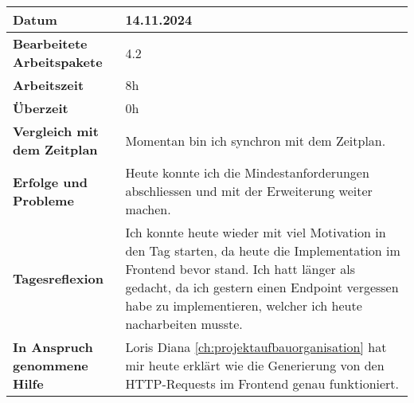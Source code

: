 \begin{longtable}{p{}|p{}}
	\hline
	\textbf{Datum}                       & 14.11.2024            \\
	\hline
	\textbf{Bearbeitete Arbeitspakete}   & 4.2                  \\
	\hline
	\textbf{Arbeitszeit}                 & 8h                                    \\
	\hline
	\textbf{Überzeit}                    & 0h                                    \\
	\hline
	\textbf{Vergleich mit dem Zeitplan}  & Momentan bin ich synchron mit dem Zeitplan. \\
	\hline
	\textbf{Erfolge und Probleme} & Heute konnte ich die Mindestanforderungen abschliessen und mit der Erweiterung weiter machen.
	\\
	\hline
	\textbf{Tagesreflexion} & Ich konnte heute wieder mit viel Motivation in den Tag starten, da heute die Implementation im Frontend bevor stand. Ich hatt länger als gedacht, da ich gestern einen Endpoint vergessen habe zu implementieren, welcher ich heute nacharbeiten musste.
	\\
	\hline
	\textbf{In Anspruch genommene Hilfe} & Loris Diana \ref{ch:projektaufbauorganisation} hat mir heute erklärt wie die Generierung von den HTTP-Requests im Frontend genau funktioniert.                              \\
	\hline
\end{longtable}\label{tab:arbeitsprotokoll-14.11.2024}
\newpage

